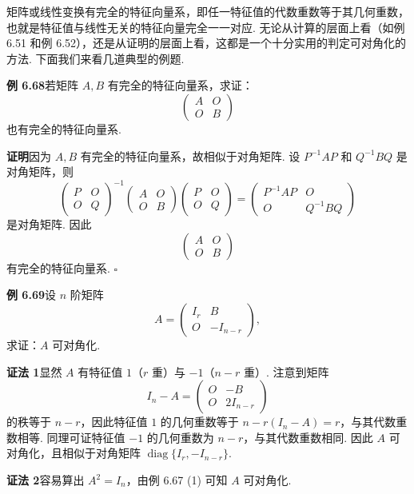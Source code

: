 \documentclass[UTF8, 12pt, fontset=fandol, oneside]{ctexart}
\begin{document}
矩阵或线性变换有完全的特征向量系，即任一特征值的代数重数等于其几何重数，也就是特征值与线性无关的特征向量完全一一对应. 无论从计算的层面上看（如例 6.51 和例 6.52），还是从证明的层面上看，这都是一个十分实用的判定可对角化的方法. 下面我们来看几道典型的例题.

\noindent\textbf{例 6.68}\quad 若矩阵 $A,B$ 有完全的特征向量系，求证：
\[
\left(\begin{array}{cc}
A & O\\
O & B
\end{array}\right)
\]
也有完全的特征向量系.

\noindent\textbf{证明}\quad 因为 $A,B$ 有完全的特征向量系，故相似于对角矩阵. 设 $P^{-1}AP$ 和 $Q^{-1}BQ$ 是对角矩阵，则
\[
\left(\begin{array}{cc}
P & O\\
O & Q
\end{array}\right)^{-1}
\left(\begin{array}{cc}
A & O\\
O & B
\end{array}\right)
\left(\begin{array}{cc}
P & O\\
O & Q
\end{array}\right)
=\left(\begin{array}{cc}
P^{-1}AP & O\\
O & Q^{-1}BQ
\end{array}\right)
\]
是对角矩阵. 因此
\[
\left(\begin{array}{cc}
A & O\\
O & B
\end{array}\right)
\]
有完全的特征向量系. $\square$

\noindent\textbf{例 6.69}\quad 设 $n$ 阶矩阵
\[
A=\left(\begin{array}{cc}
I_r & B\\
O & -I_{n-r}
\end{array}\right),
\]
求证：$A$ 可对角化.

\noindent\textbf{证法 1}\quad 显然 $A$ 有特征值 $1$（$r$ 重）与 $-1$（$n-r$ 重）. 注意到矩阵
\[
I_n-A=\left(\begin{array}{cc}
O & -B\\
O & 2I_{n-r}
\end{array}\right)
\]
的秩等于 $n-r$，因此特征值 $1$ 的几何重数等于 $n-r(I_n-A)=r$，与其代数重数相等. 同理可证特征值 $-1$ 的几何重数为 $n-r$，与其代数重数相同. 因此 $A$ 可对角化，且相似于对角矩阵 $\operatorname{diag}\{I_r,-I_{n-r}\}$.

\noindent\textbf{证法 2}\quad 容易算出 $A^2=I_n$，由例 6.67 (1) 可知 $A$ 可对角化.
\end{document}
